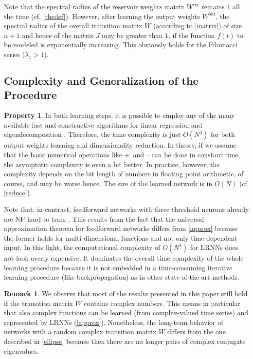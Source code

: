 \documentclass[twoside,11pt]{article}
\theoremstyle{definition}
\newtheorem{prop}{Property}
\newtheorem{remk}{Remark}
\begin{document}
Note that the spectral radius of the reservoir weights matrix $W^\mathrm{res}$
remains $1$ all the time (cf. \cref{thedef}). However, after learning the output
weights $W^\mathrm{out}$, the spectral radius of the overall transition matrix
$W$ (according to \cref{matrix}) of size $n+1$ and hence of the matrix $J$ may
be greater than $1$, if the function $f(t)$ to be modeled is exponentially
increasing. This obviously holds for the Fibonacci series ($\lambda_1>1$).

\subsection{Complexity and Generalization of the Procedure}

\begin{prop}\label{complexity}
In both learning steps, it is possible to employ any of the many available fast
and constructive algorithms for linear regression and eigendecomposition
\citep{DDH07}. Therefore, the time complexity is just $O(N^3)$ for both output
weights learning and dimensionality reduction. In theory, if we assume that
the basic numerical operations like $+$~and~$\cdot$ can be done in constant
time, the asymptotic complexity is even a bit better. In practice, however, the
complexity depends on the bit length of numbers in floating point arithmetic,
of course, and may be worse hence. The size of the learned network is in $O(N)$
(cf. \cref{reduce}).
\end{prop}

Note that, in contrast, feedforward networks with three threshold neurons
already are NP-hard to train \citep{BR92}. This results from the fact
that the universal approximation theorem for feedforward networks differs from
\cref{approx} because the former holds for multi-dimensional functions and
not only time-dependent input. In this light, the computational complexity of
$O(N^3)$ for LRNNs does not look overly expensive. It dominates the
overall time complexity of the whole learning procedure because it is not
embedded in a time-consuming iterative learning procedure (like backpropagation)
as in other state-of-the-art methods.

\begin{remk}
We observe that most of the results presented in this paper still
hold if the transition matrix $W$ contains complex numbers. This means in
particular that also complex functions can be learned (from complex-valued time
series) and represented by LRNNs (\cref{approx}).
Nonetheless, the long-term behavior of networks with a random complex transition
matrix $W$ differs from the one described in \cref{ellipse} because then
there are no longer pairs of complex conjugate eigenvalues.
\end{remk}
\end{document}
